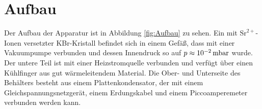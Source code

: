\section{Aufbau}
\label{sec:Aufbau}

Der Aufbau der Apparatur ist in Abbildung \ref{fig:Aufbau} zu sehen.
Ein mit $\mathrm{Sr}^{2+}$-Ionen versetzter KBr-Kristall befindet sich in einem Gefäß, dass mit einer Vakuumpumpe verbunden und dessen Innendruck so auf $p\approx\SI{E-2}{\milli\bar}$ wurde. Der untere Teil ist mit einer Heizstromquelle verbunden und verfügt über einen Kühlfinger aus gut wärmeleitendem Material.
Die Ober- und Unterseite des Behälters besteht aus einem Plattenkondensator, der mit einem Gleichspannungsnetzgerät, einem Erdungskabel und einem Piccoamperemeter verbunden werden kann.